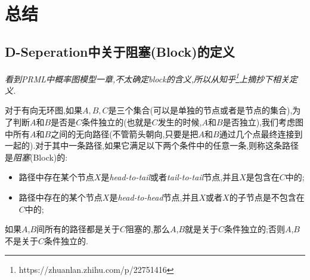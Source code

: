 \section*{总结}

\subsection*{D-Seperation中关于阻塞(Block)的定义}

\textit{看到PRML中概率图模型一章,不太确定block的含义,所以从知乎\footnote{https://zhuanlan.zhihu.com/p/22751416}上摘抄下相关定义.}

对于有向无环图,如果$A,B,C$是三个集合(可以是单独的节点或者是节点的集合),为了判断$A$和$B$是否是$C$条件独立的(也就是$C$发生的时候,$A$和$B$是否独立),我们考虑图中所有$A$和$B$之间的无向路径(不管箭头朝向,只要是把$A$和$B$通过几个点最终连接到一起的).对于其中一条路径,如果它满足以下两个条件中的任意一条,则称这条路径是\textit{阻塞}(Block)的:
\begin{itemize}
    \item 路径中存在某个节点$X$是\textit{head-to-tail}或者\textit{tail-to-tail}节点,并且$X$是包含在$C$中的;
    \item 路径中存在的某个节点$X$是\textit{head-to-head}节点,并且$X$或者$X$的子节点是不包含在$C$中的;
\end{itemize}
如果$A$,$B$间所有的路径都是关于$C$阻塞的,那么$A$,$B$就是关于$C$条件独立的;否则$A$,$B$不是关于$C$条件独立的.